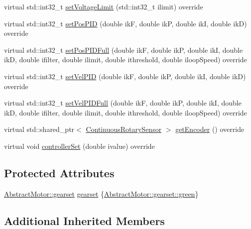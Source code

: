 \begin{DoxyCompactItemize}
virtual std\+::int32\+\_\+t \mbox{\hyperlink{classokapi_1_1Motor_a5aab4b416675b7f7ee324fff4d8cda30}{set\+Voltage\+Limit}} (std\+::int32\+\_\+t ilimit) override
\item 
virtual std\+::int32\+\_\+t \mbox{\hyperlink{classokapi_1_1Motor_ae885a297c4471bddf5729c702f0b4a38}{set\+Pos\+P\+ID}} (double ikF, double ikP, double ikI, double ikD) override
\item 
virtual std\+::int32\+\_\+t \mbox{\hyperlink{classokapi_1_1Motor_adb3656e96c31dd0a584cf6692459ad9b}{set\+Pos\+P\+I\+D\+Full}} (double ikF, double ikP, double ikI, double ikD, double ifilter, double ilimit, double ithreshold, double iloop\+Speed) override
\item 
virtual std\+::int32\+\_\+t \mbox{\hyperlink{classokapi_1_1Motor_a6a78550fa3eee6efa092307e4b159d68}{set\+Vel\+P\+ID}} (double ikF, double ikP, double ikI, double ikD) override
\item 
virtual std\+::int32\+\_\+t \mbox{\hyperlink{classokapi_1_1Motor_af09e5a627843ec895b78077d8a5326a5}{set\+Vel\+P\+I\+D\+Full}} (double ikF, double ikP, double ikI, double ikD, double ifilter, double ilimit, double ithreshold, double iloop\+Speed) override
\item 
virtual std\+::shared\+\_\+ptr$<$ \mbox{\hyperlink{classokapi_1_1ContinuousRotarySensor}{Continuous\+Rotary\+Sensor}} $>$ \mbox{\hyperlink{classokapi_1_1Motor_a57d8ddb900475fcfba56413e61e6e252}{get\+Encoder}} () override
\item 
virtual void \mbox{\hyperlink{classokapi_1_1Motor_a262c36a80a942d125e574d691b77b440}{controller\+Set}} (double ivalue) override
\end{DoxyCompactItemize}
\subsection*{Protected Attributes}
\begin{DoxyCompactItemize}
\item 
\mbox{\hyperlink{classokapi_1_1AbstractMotor_a88aaa6ea2fa10f5520a537bbf26774d5}{Abstract\+Motor\+::gearset}} \mbox{\hyperlink{classokapi_1_1Motor_a98f1ccfe295ebc9c4dd268f44d5f7c42}{gearset}} \{\mbox{\hyperlink{classokapi_1_1AbstractMotor_a88aaa6ea2fa10f5520a537bbf26774d5a9f27410725ab8cc8854a2769c7a516b8}{Abstract\+Motor\+::gearset\+::green}}\}
\end{DoxyCompactItemize}
\subsection*{Additional Inherited Members}



